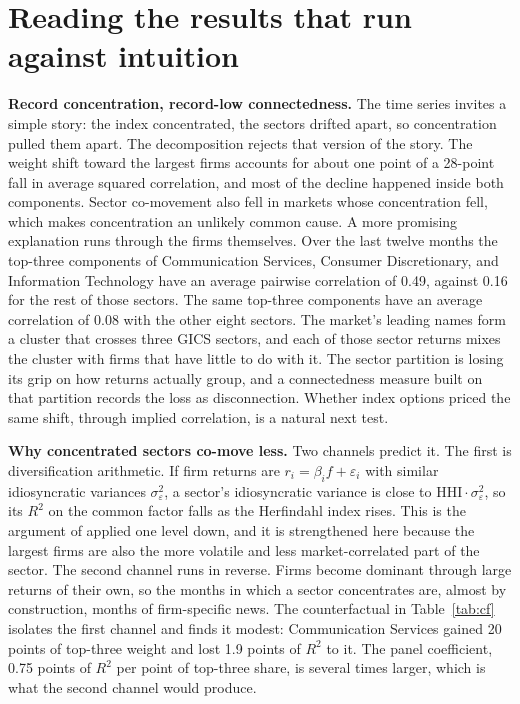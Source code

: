 \documentclass[11pt]{article}
\begin{document}
\section{Reading the results that run against intuition}\label{sec:disc}

\textbf{Record concentration, record-low connectedness.} The time series invites a simple story: the index concentrated, the sectors drifted apart, so concentration pulled them apart. The decomposition rejects that version of the story. The weight shift toward the largest firms accounts for about one point of a 28-point fall in average squared correlation, and most of the decline happened inside both components. Sector co-movement also fell in markets whose concentration fell, which makes concentration an unlikely common cause. A more promising explanation runs through the firms themselves. Over the last twelve months the top-three components of Communication Services, Consumer Discretionary, and Information Technology have an average pairwise correlation of 0.49, against 0.16 for the rest of those sectors. The same top-three components have an average correlation of 0.08 with the other eight sectors. The market's leading names form a cluster that crosses three GICS sectors, and each of those sector returns mixes the cluster with firms that have little to do with it. The sector partition is losing its grip on how returns actually group, and a connectedness measure built on that partition records the loss as disconnection. Whether index options priced the same shift, through implied correlation, is a natural next test.

\textbf{Why concentrated sectors co-move less.} Two channels predict it. The first is diversification arithmetic. If firm returns are $r_i=\beta_i f + \varepsilon_i$ with similar idiosyncratic variances $\sigma^2_\varepsilon$, a sector's idiosyncratic variance is close to $\text{HHI}\cdot\sigma^2_\varepsilon$, so its $R^2$ on the common factor falls as the Herfindahl index rises. This is the argument of \citet{gabaix2011} applied one level down, and it is strengthened here because the largest firms are also the more volatile and less market-correlated part of the sector. The second channel runs in reverse. Firms become dominant through large returns of their own, so the months in which a sector concentrates are, almost by construction, months of firm-specific news. The counterfactual in Table~\ref{tab:cf} isolates the first channel and finds it modest: Communication Services gained 20 points of top-three weight and lost 1.9 points of $R^2$ to it. The panel coefficient, 0.75 points of $R^2$ per point of top-three share, is several times larger, which is what the second channel would produce.
\end{document}
